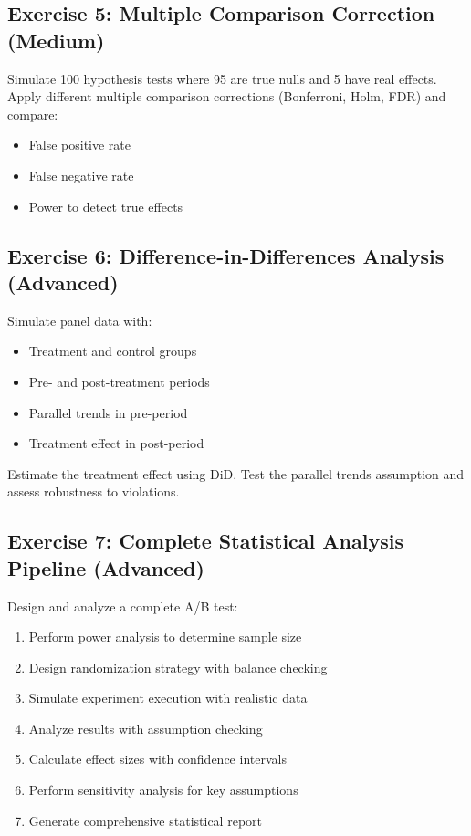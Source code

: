 \subsection{Exercise 5: Multiple Comparison Correction (Medium)}

Simulate 100 hypothesis tests where 95 are true nulls and 5 have real effects. Apply different multiple comparison corrections (Bonferroni, Holm, FDR) and compare:
\begin{itemize}
    \item False positive rate
    \item False negative rate
    \item Power to detect true effects
\end{itemize}

\subsection{Exercise 6: Difference-in-Differences Analysis (Advanced)}

Simulate panel data with:
\begin{itemize}
    \item Treatment and control groups
    \item Pre- and post-treatment periods
    \item Parallel trends in pre-period
    \item Treatment effect in post-period
\end{itemize}

Estimate the treatment effect using DiD. Test the parallel trends assumption and assess robustness to violations.

\subsection{Exercise 7: Complete Statistical Analysis Pipeline (Advanced)}

Design and analyze a complete A/B test:

\begin{enumerate}
    \item Perform power analysis to determine sample size
    \item Design randomization strategy with balance checking
    \item Simulate experiment execution with realistic data
    \item Analyze results with assumption checking
    \item Calculate effect sizes with confidence intervals
    \item Perform sensitivity analysis for key assumptions
    \item Generate comprehensive statistical report
\end{enumerate}

